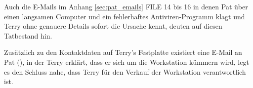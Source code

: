 Auch die E-Mails im Anhang \ref{sec:pat_emails} FILE 14 bis 16 in denen Pat über einen langsamen Computer und ein fehlerhaftes Antiviren-Programm klagt und Terry ohne genauere Details sofort die Ursache kennt, deuten auf diesen Tatbestand hin.\newline

Zusätzlich zu den Kontaktdaten auf Terry's Festplatte existiert eine E-Mail an Pat (), in der Terry erklärt, dass er sich um die Workstation kümmern wird, legt es den Schluss nahe, dass Terry für den Verkauf der Workstation verantwortlich ist.

